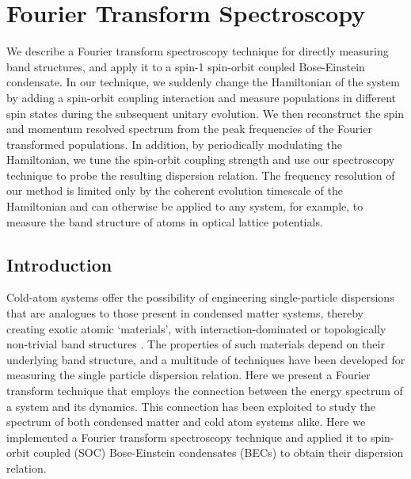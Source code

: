 
\renewcommand{\thechapter}{5}

\chapter{Fourier Transform Spectroscopy}



We describe a Fourier transform spectroscopy technique for directly measuring band structures, and apply it to a spin-1 spin-orbit coupled Bose-Einstein condensate. In our technique, we suddenly change the Hamiltonian of the system by adding a spin-orbit coupling interaction and measure populations in different spin states during the subsequent unitary evolution. We then reconstruct the spin and momentum resolved spectrum from the peak frequencies of the Fourier transformed populations. In addition, by periodically modulating the Hamiltonian, we tune the spin-orbit coupling strength and use our spectroscopy technique to probe the resulting dispersion relation. The frequency resolution of our method is limited only by the coherent evolution timescale of the Hamiltonian and can otherwise be applied to any system, for example, to measure the band structure of atoms in optical lattice potentials. 
	 


\section{Introduction}



Cold-atom systems offer the possibility of engineering single-particle dispersions that are analogues to those present in condensed matter systems, thereby creating exotic atomic `materials', with interaction-dominated or topologically non-trivial band structures \cite{lindner_floquet_2011,radic_strong_2015}. The properties of such materials depend on their underlying band structure, and a multitude of techniques have been developed for measuring the single particle dispersion relation. Here we present a Fourier transform technique that employs the connection between the energy spectrum of a system and its dynamics. This connection has been exploited to study the spectrum of both condensed matter \cite{jonas_two-dimensional_2003} and cold atom systems \cite{yoshimura_diabatic-ramping_2014,wang_atom-interferometric_2015} alike. Here we implemented a Fourier transform spectroscopy technique and applied it to spin-orbit coupled (SOC) Bose-Einstein condensates (BECs) to obtain their dispersion relation.

